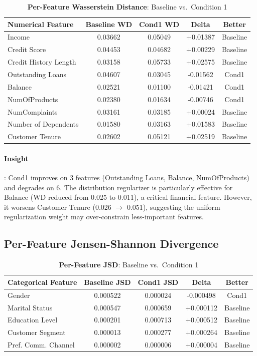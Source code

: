 \documentclass{article}
\begin{document}
\begin{table}[ht]
\centering
\caption{\textbf{Per-Feature Wasserstein Distance}: Baseline vs.~Condition 1}
\label{tab:wd_per_feature}
\begin{tabular}{lcccc}
\toprule
Numerical Feature & Baseline WD & Cond1 WD & Delta & Better \\
\midrule
Income & 0.03662 & 0.05049 & +0.01387 & Baseline \\
Credit Score & 0.04453 & 0.04682 & +0.00229 & Baseline \\
Credit History Length & 0.03158 & 0.05733 & +0.02575 & Baseline \\
Outstanding Loans & 0.04607 & 0.03045 & -0.01562 & Cond1 \\
Balance & 0.02521 & 0.01100 & -0.01421 & Cond1 \\
NumOfProducts & 0.02380 & 0.01634 & -0.00746 & Cond1 \\
NumComplaints & 0.03161 & 0.03185 & +0.00024 & Baseline \\
Number of Dependents & 0.01580 & 0.03163 & +0.01583 & Baseline \\
Customer Tenure & 0.02602 & 0.05121 & +0.02519 & Baseline \\
\bottomrule
\end{tabular}
\end{table}

\paragraph{Insight}: Cond1 improves on 3 features (Outstanding Loans, Balance, NumOfProducts) and degrades on 6. The distribution regularizer is particularly effective for Balance (WD reduced from 0.025 to 0.011), a critical financial feature. However, it worsens Customer Tenure (0.026 $\to$ 0.051), suggesting the uniform regularization weight may over-constrain less-important features.

\subsection{Per-Feature Jensen-Shannon Divergence}

\begin{table}[ht]
\centering
\caption{\textbf{Per-Feature JSD}: Baseline vs.~Condition 1}
\label{tab:jsd_per_feature}
\begin{tabular}{lcccc}
\toprule
Categorical Feature & Baseline JSD & Cond1 JSD & Delta & Better \\
\midrule
Gender & 0.000522 & 0.000024 & -0.000498 & Cond1 \\
Marital Status & 0.000547 & 0.000659 & +0.000112 & Baseline \\
Education Level & 0.000201 & 0.000713 & +0.000512 & Baseline \\
Customer Segment & 0.000013 & 0.000277 & +0.000264 & Baseline \\
Pref. Comm. Channel & 0.000002 & 0.000006 & +0.000004 & Baseline \\
\bottomrule
\end{tabular}
\end{table}
\end{document}
